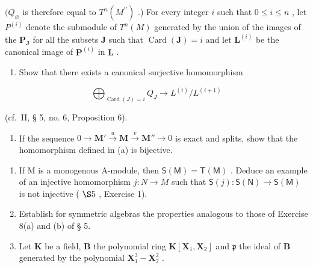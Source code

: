 \((Q_{\varnothing}\) is therefore equal to \(T^{n}(M^{\prime \prime})\) .) For every integer \(i\) such that \(0 \leqslant i \leqslant n\) , let \(P^{(i)}\) denote the submodule of \(T^{n}(M)\) generated by the union of the images of the \(\mathbf{P}_{\mathbf{J}}\) for all the subsets \(\mathbf{J}\) such that \(\operatorname{Card}(\mathbf{J}) = i\) and let \(\mathbf{L}^{(i)}\) be the canonical image of \(\mathbf{P}^{(i)}\) in \(\mathbf{L}\) .

\begin{enumerate}
\def\labelenumi{(\alph{enumi})}
\tightlist
\item
  Show that there exists a canonical surjective homomorphism
\end{enumerate}

\[
\bigoplus_ {\operatorname{Card} (J) = i} Q _ {J} \rightarrow L ^ {(i)} / L ^ {(i + 1)}
\]

(cf.~II, § 5, no. 6, Proposition 6).

\begin{enumerate}
\def\labelenumi{(\alph{enumi})}
\setcounter{enumi}{1}
\tightlist
\item
  If the sequence \(0 \to \mathbf{M}' \xrightarrow{u} \mathbf{M} \xrightarrow{v} \mathbf{M}'' \to 0\) is exact and splits, show that the homomorphism defined in (a) is bijective.
\end{enumerate}

\BourbakiExercisesSection

\begin{enumerate}
\def\labelenumi{\arabic{enumi}.}
\item
  If M is a monogenous A-module, then \(\mathsf{S}(\mathsf{M}) = \mathsf{T}(\mathsf{M})\) . Deduce an example of an injective homomorphism \(j: N \to M\) such that \(\mathsf{S}(j): \mathsf{S}(\mathsf{N}) \to \mathsf{S}(\mathsf{M})\) is not injective ( \(\S 5\) , Exercise 1).
\item
  Establish for symmetric algebras the properties analogous to those of Exercise 8(a) and (b) of § 5.
\item
  Let \(\mathbf{K}\) be a field, \(\mathbf{B}\) the polynomial ring \(\mathbf{K}[\mathbf{X}_1, \mathbf{X}_2]\) and \(\mathfrak{p}\) the ideal of \(\mathbf{B}\) generated by the polynomial \(\mathbf{X}_1^3 - \mathbf{X}_2^2\) .
\end{enumerate}

